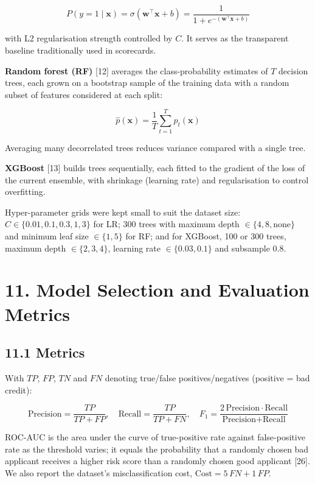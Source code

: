 \documentclass[
  11pt,
]{article}
\begin{document}
\[P(y=1 \mid \mathbf{x}) = \sigma(\mathbf{w}^\top \mathbf{x} + b) = \frac{1}{1 + e^{-(\mathbf{w}^\top \mathbf{x} + b)}}\]

with L2 regularisation strength controlled by \(C\). It serves as the
transparent baseline traditionally used in scorecards.

\textbf{Random forest (RF)} {[}12{]} averages the class-probability
estimates of \(T\) decision trees, each grown on a bootstrap sample of
the training data with a random subset of features considered at each
split:

\[\hat{p}(\mathbf{x}) = \frac{1}{T} \sum_{t=1}^{T} p_t(\mathbf{x})\]

Averaging many decorrelated trees reduces variance compared with a
single tree.

\textbf{XGBoost} {[}13{]} builds trees sequentially, each fitted to the
gradient of the loss of the current ensemble, with shrinkage (learning
rate) and regularisation to control overfitting.

Hyper-parameter grids were kept small to suit the dataset size:
\(C \in \{0.01, 0.1, 0.3, 1, 3\}\) for LR; 300 trees with maximum depth
\(\in \{4, 8, \text{none}\}\) and minimum leaf size \(\in \{1, 5\}\) for
RF; and for XGBoost, 100 or 300 trees, maximum depth
\(\in \{2, 3, 4\}\), learning rate \(\in \{0.03, 0.1\}\) and subsample
0.8.

\hypertarget{model-selection-and-evaluation-metrics}{%
\section{11. Model Selection and Evaluation
Metrics}\label{model-selection-and-evaluation-metrics}}

\hypertarget{metrics}{%
\subsection{11.1 Metrics}\label{metrics}}

With \(TP\), \(FP\), \(TN\) and \(FN\) denoting true/false
positives/negatives (positive = bad credit):

\[\text{Precision} = \frac{TP}{TP+FP}, \quad \text{Recall} = \frac{TP}{TP+FN}, \quad F_1 = \frac{2\,\text{Precision}\cdot\text{Recall}}{\text{Precision}+\text{Recall}}\]

ROC-AUC is the area under the curve of true-positive rate against
false-positive rate as the threshold varies; it equals the probability
that a randomly chosen bad applicant receives a higher risk score than a
randomly chosen good applicant {[}26{]}. We also report the dataset's
misclassification cost, \(\text{Cost} = 5\,FN + 1\,FP\).
\end{document}
